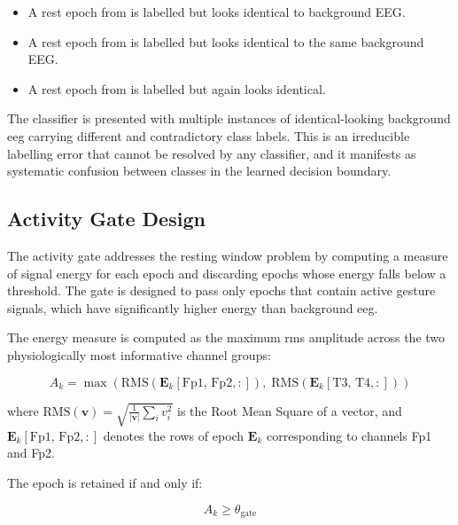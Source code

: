 \begin{itemize}[leftmargin=*]
    \item A rest epoch from  is labelled
     but looks identical to background EEG.
    \item A rest epoch from  is labelled
     but looks identical to the same
    background EEG.
    \item A rest epoch from  is labelled
     but again looks identical.
\end{itemize}

The classifier is presented with multiple instances of
identical-looking background \acrshort{eeg} carrying different
and contradictory class labels. This is an irreducible
labelling error that cannot be resolved by any classifier, and
it manifests as systematic confusion between classes in the
learned decision boundary.

\subsection{Activity Gate Design}

The activity gate addresses the resting window problem by
computing a measure of signal energy for each epoch and
discarding epochs whose energy falls below a threshold. The
gate is designed to pass only epochs that contain active
gesture signals, which have significantly higher energy than
background \acrshort{eeg}.

The energy measure is computed as the maximum \acrshort{rms}
amplitude across the two physiologically most informative
channel groups:

\begin{equation}
A_k = \max\!\left(
\text{RMS}\!\left(\mathbf{E}_k[\text{Fp1, Fp2}, :]\right),\;
\text{RMS}\!\left(\mathbf{E}_k[\text{T3, T4}, :]\right)
\right)
\label{eq:activity}
\end{equation}

\noindent where $\text{RMS}(\mathbf{v}) =
\sqrt{\frac{1}{|\mathbf{v}|}\sum_i v_i^2}$ is the Root Mean
Square of a vector, and $\mathbf{E}_k[\text{Fp1, Fp2}, :]$
denotes the rows of epoch $\mathbf{E}_k$ corresponding to
channels Fp1 and Fp2.

The epoch is retained if and only if:

\begin{equation}
A_k \geq \theta_{\text{gate}}
\label{eq:gate_criterion}
\end{equation}


